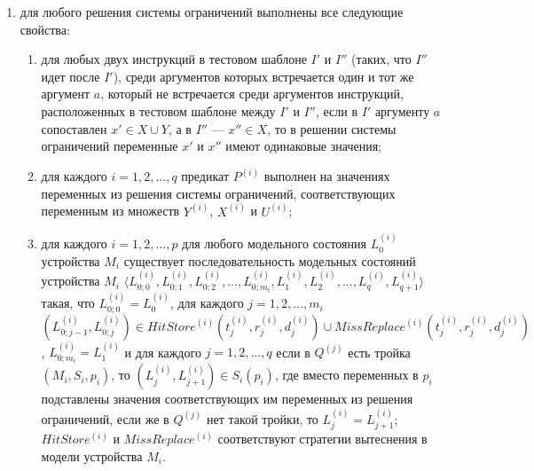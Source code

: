 \begin{enumerate}
    \item для любого решения системы ограничений выполнены все следующие свойства:
        \begin{enumerate}
          \item для любых двух инструкций в тестовом шаблоне $I'$ и $I''$ (таких, что $I''$ идет после $I'$), среди аргументов которых встречается один и тот же аргумент $a$, который не встречается среди аргументов инструкций, расположенных в тестовом шаблоне между $I'$ и $I''$, если в $I'$ аргументу $a$ сопоставлен $x' \in X \cup Y$, а в $I''$ --- $x'' \in X$, то в решении системы ограничений переменные $x'$ и $x''$ имеют одинаковые значения;
          \item для каждого $i = 1, 2, ..., q$ предикат $P^{(i)}$ выполнен на значениях переменных из решения системы ограничений, соответствующих переменным из множеств $Y^{(i)}$, $X^{(i)}$ и $U^{(i)}$;
          \item для каждого $i = 1, 2, ..., p$ для любого модельного состояния $L_0^{(i)}$ устройства $M_i$ существует последовательность модельных состояний устройства $M_i$ $\langle L_{0;0}^{(i)}, L_{0;1}^{(i)}, L_{0;2}^{(i)}, ..., L_{0;m_i}^{(i)}, L_1^{(i)}, L_2^{(i)}, ..., L_q^{(i)}, L_{q+1}^{(i)} \rangle$ такая, что $L_{0;0}^{(i)} = L_0^{(i)}$, для каждого $j = 1, 2, ..., m_i$ $(L_{0;j-1}^{(i)}, L_{0;j}^{(i)}) \in HitStore^{(i)} (t_j^{(i)}, r_j^{(i)}, d_j^{(i)}) \cup MissReplace^{(i)} (t_j^{(i)}, r_j^{(i)}, d_j^{(i)})$, $L_{0;m_i}^{(i)} = L_1^{(i)}$ и для каждого $j = 1, 2, ..., q$ если в $Q^{(j)}$ есть тройка $(M_i, S_i, p_i)$, то $(L_j^{(i)}, L_{j+1}^{(i)}) \in S_i(p_i)$, где вместо переменных в $p_i$ подставлены значения соответствующих им переменных из решения ограничений, если же в $Q^{(j)}$ нет такой тройки, то $L_j^{(i)} = L_{j+1}^{(i)}$; $HitStore^{(i)}$ и $MissReplace^{(i)}$ соответствуют стратегии вытеснения в модели устройства $M_i$.
        \end{enumerate}
  \end{enumerate}

